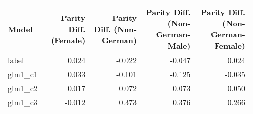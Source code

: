 \begin{tabular}{lrrrr}
\toprule
Model & Parity Diff. (Female) & Parity Diff. (Non-German) & Parity Diff. (Non-German-Male) & Parity Diff. (Non-German-Female) \\
\midrule
label & 0.024 & -0.022 & -0.047 & 0.024 \\
glm1_c1 & 0.033 & -0.101 & -0.125 & -0.035 \\
glm1_c2 & 0.017 & 0.072 & 0.073 & 0.050 \\
glm1_c3 & -0.012 & 0.373 & 0.376 & 0.266 \\
\bottomrule
\end{tabular}
